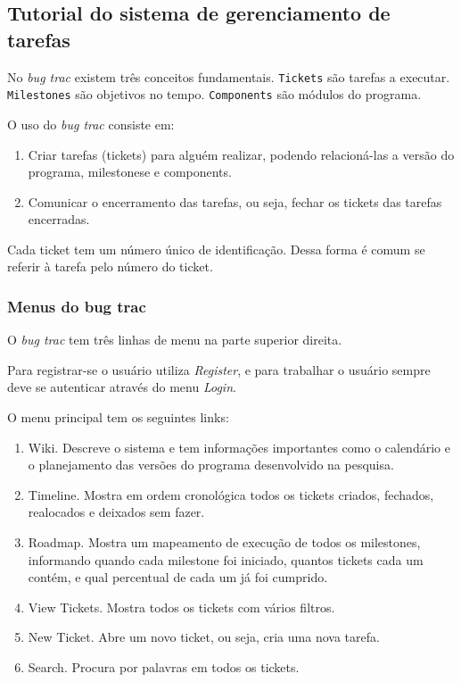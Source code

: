 \documentclass[12pt,brazil]{book}
\newcommand{\eng}[1]{\textit{#1}}
\begin{document}
\subsection{Tutorial do sistema de gerenciamento de tarefas}
\label{sec:tutorial-do-sistema}

No \eng{bug trac} existem três conceitos
fundamentais. \texttt{Tickets} são tarefas a
executar. \texttt{Milestones} são objetivos no
tempo. \texttt{Components} são módulos do programa.

O uso do \eng{bug trac} consiste em:

\begin{enumerate}
\item Criar tarefas (tickets) para alguém realizar, podendo
  relacioná-las a versão do programa, milestonese e components.
\item Comunicar o encerramento das tarefas, ou seja, fechar os tickets
  das tarefas encerradas.
\end{enumerate}

Cada ticket tem um número único de identificação. Dessa forma é comum
se referir à tarefa pelo número do ticket.

\subsubsection{Menus do bug trac}
\label{sec:menus-do-bug}

O \eng{bug trac} tem três linhas de menu na parte superior direita.

Para registrar-se o usuário utiliza \eng{Register}, e para trabalhar o
usuário sempre deve se autenticar através do menu \eng{Login}.

O menu principal tem os seguintes links:

\begin{enumerate}
\item Wiki. Descreve o sistema e tem informações importantes como o
  calendário e o planejamento das versões do programa desenvolvido na
  pesquisa.
\item Timeline. Mostra em ordem cronológica todos os tickets criados,
  fechados, realocados e deixados sem fazer.
\item Roadmap. Mostra um mapeamento de execução de todos os
  milestones, informando quando cada milestone foi iniciado, quantos
  tickets cada um contém, e qual percentual de cada um já foi
  cumprido.
\item View Tickets. Mostra todos os tickets com vários filtros.
\item New Ticket. Abre um novo ticket, ou seja, cria uma nova tarefa.
\item Search. Procura por palavras em todos os tickets.
\end{enumerate}
\end{document}
